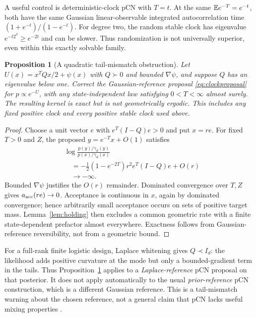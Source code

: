 \documentclass[pdflatex,iicol,sn-mathphys-ay]{sn-jnl}
\newtheorem{proposition}[theorem]{Proposition}
\theoremstyle{definition}\newtheorem{definition}[theorem]{Definition}
\theoremstyle{remark}\newtheorem{remark}[theorem]{Remark}
\numberwithin{equation}{section}
\newcommand{\1}{\mathbf 1}
\begin{document}
A useful control is deterministic-clock pCN with $T=t$. At the same $\mathbb E e^{-T}=e^{-t}$, both have the same Gaussian linear-observable integrated autocorrelation time $(1+e^{-t})/(1-e^{-t})$. For degree two, the random stable clock has eigenvalue $e^{-t2^\beta}\ge e^{-2t}$ and can be slower. Thus randomization is not universally superior, even within this exactly solvable family.

\begin{proposition}[A quadratic tail-mismatch obstruction]\label{prop:reference_tail}
Let $U(x)=x^TQx/2+\psi(x)$ with $Q\succ0$ and bounded $\nabla\psi$, and suppose $Q$ has an eigenvalue below one. Correct the Gaussian-reference proposal \eqref{eq:clockproposal} for $p\propto e^{-U}$, with any state-independent law satisfying $0<T<\infty$ almost surely. The resulting kernel is exact but is not geometrically ergodic. This includes any fixed positive clock and every positive stable clock used above.
\end{proposition}
\begin{proof}
Choose a unit vector $e$ with $e^T(I-Q)e>0$ and put $x=re$. For fixed $T>0$ and $Z$, the proposed $y=e^{-T}x+O(1)$ satisfies
\[
\begin{aligned}
&\log\frac{p(y)/\gamma_d(y)}{p(x)/\gamma_d(x)}\\
&\quad=-\tfrac12(1-e^{-2T})r^2 e^T(I-Q)e+O(r)\\
&\quad\longrightarrow-\infty.
\end{aligned}
\]
Bounded $\nabla\psi$ justifies the $O(r)$ remainder. Dominated convergence over $T,Z$ gives $a_{\rm acc}(re)\to0$. Acceptance is continuous in $x$, again by dominated convergence; hence arbitrarily small acceptance occurs on sets of positive target mass. Lemma~\ref{lem:holding} then excludes a common geometric rate with a finite state-dependent prefactor almost everywhere. Exactness follows from Gaussian-reference reversibility, not from a geometric bound.
\end{proof}
For a full-rank finite logistic design, Laplace whitening gives $Q\prec I_d$: the likelihood adds positive curvature at the mode but only a bounded-gradient term in the tails. Thus Proposition~\ref{prop:reference_tail} applies to a \emph{Laplace-reference} pCN proposal on that posterior. It does not apply automatically to the usual \emph{prior-reference} pCN construction, which is a different Gaussian reference. This is a tail-mismatch warning about the chosen reference, not a general claim that pCN lacks useful mixing properties \citep{cotter,hairer}.
\end{document}
